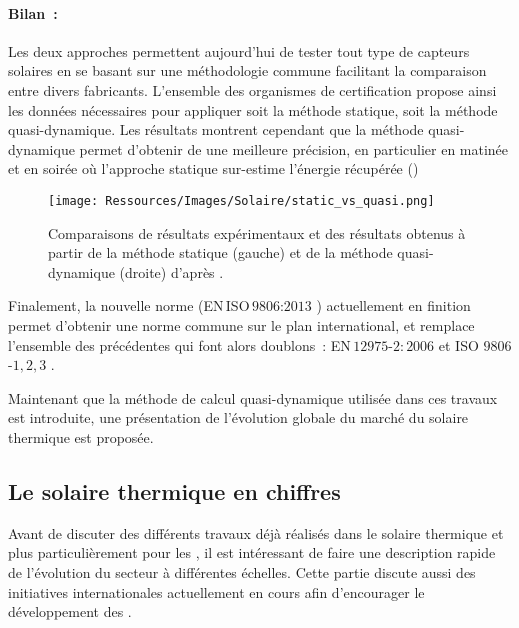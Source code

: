 \paragraph{Bilan~:} %
\label{par:bilan_rendement}
Les deux approches permettent aujourd’hui de tester tout type de capteurs solaires
en se basant sur une méthodologie commune facilitant la comparaison entre divers
fabricants. L’ensemble des organismes de certification propose ainsi les données nécessaires
pour appliquer soit la méthode statique, soit la méthode quasi-dynamique.
Les résultats montrent cependant que la méthode quasi-dynamique permet d’obtenir de
une meilleure précision, en particulier en matinée et en soirée
où l’approche statique sur-estime l’énergie récupérée ()

\begin{figure}
    \centering
    \texttt{[image: Ressources/Images/Solaire/static\_vs\_quasi.png]}
    \caption[Comparaison entre la méthode statique et la méthode quasi-dynamique]
            {Comparaisons de résultats expérimentaux et des résultats obtenus
             à partir de la méthode statique (gauche) et de la méthode quasi-dynamique (droite)
             d’après \textcite{Zambolin20101382}.}
    \label{fig:compare_static_quasi_dyn}
\end{figure}

Finalement, la nouvelle norme (EN\,ISO\,$9806$:$2013$ ) actuellement en finition permet d’obtenir
une norme commune sur le plan international, et remplace l’ensemble des précédentes qui font alors doublons~:
EN\,$12975$-$2:2006$ et ISO $9806$-$1,2,3$ \parencite{ISO98062013}.

Maintenant que la méthode de calcul quasi-dynamique utilisée dans ces travaux est
introduite, une présentation de l’évolution globale du marché du solaire thermique
est proposée.


\subsection{Le solaire thermique en chiffres} %
\label{sub:le_solaire_thermique_en_chiffres}
Avant de discuter des différents travaux déjà réalisés dans le solaire thermique
et plus particulièrement pour les , il est intéressant de faire une description
rapide de l’évolution du secteur à différentes échelles. Cette partie discute aussi
des initiatives internationales actuellement en cours afin d’encourager le développement des
.

